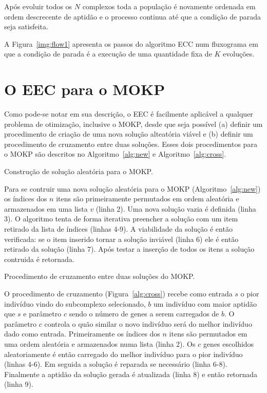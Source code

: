 Após evoluir todos os $N$ complexos toda a população é novamente ordenada
em ordem descrecente de aptidão e o processo continua até que a condição
de parada seja satisfeita.

A Figura~\ref{img:flow1} apresenta os passos do algoritmo ECC num fluxograma
em que a condição de parada é a execução de uma quantidade fixa de $K$ evoluções.


\section{O EEC para o MOKP}
Como pode-se notar em sua descrição, o EEC é facilmente aplicável a qualquer
problema de otimização, inclusive o MOKP, desde que seja possível (a) definir
um procedimento de criação de uma nova solução alteatória viável e (b) definir
um procedimento de cruzamento entre duas soluções.
Esses dois procedimentos para o MOKP são descritos no Algoritmo~\ref{alg:new}
e Algoritmo~\ref{alg:cross}.

\begin{algorithm}
  
  \caption{Construção de solução aleatória para o MOKP.}
  \label{alg:new}
\end{algorithm}

Para se contruir uma nova solução aleatória para o MOKP (Algoritmo~\ref{alg:new})
os índices dos $n$ itens são primeiramente permutados em ordem aleatória e
armazenados em uma lista $v$ (linha 2).
Uma nova solução vazia é definida (linha 3).
O algoritmo tenta de forma iterativa preencher a solução com um item retirado
da lista de índices (linhas 4-9).
A viabilidade da solução é então verificada: se o item inserido tornar a solução
inviável (linha 6) ele é então retirado da solução (linha 7).
Após testar a inserção de todos os itens a solução contruida é retornada.

\begin{algorithm}
  
  \caption{Procedimento de cruzamento entre duas soluções do MOKP.}
  \label{alg:cross}
\end{algorithm}


O procedimento de cruzamento (Figura~\ref{alg:cross}) recebe como entrada
$s$ o pior indivíduo vindo do subcomplexo selecionado, $b$ um indivíduo com
maior aptidão que $s$ e parâmetro $c$ sendo o número de genes a serem carregados de $b$.
O parâmetro $c$ controla o quão similar o novo indivíduo será do melhor indivíduo
dado como entrada.
Primeiramente os índices dos $n$ itens são permutados em uma ordem aleatória e armazenados numa lista
(linha 2).
Os $c$ genes escolhidos aleatoriamente é então carregado do melhor indivíduo para
o pior indivíduo (linhas 4-6).
Em seguida a solução é reparada se necessário (linha 6-8).
Finalmente a aptidão da solução gerada é atualizada (linha 8) e então retornada (linha 9).


